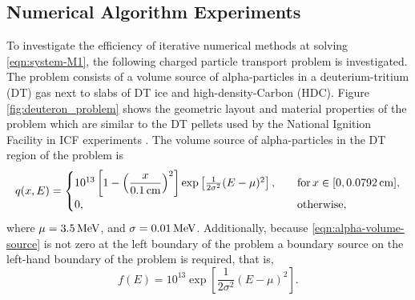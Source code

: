 \subsection{Numerical Algorithm Experiments}
To investigate the efficiency of iterative numerical methods at solving \ref{eqn:system-M1}, the following charged particle transport problem is investigated. The problem consists of a volume source of alpha-particles in a deuterium-tritium (DT) gas next to slabs of DT ice and high-density-Carbon (HDC). Figure \ref{fig:deuteron_problem} shows the geometric layout and material properties of the problem which are similar to the DT pellets used by the National Ignition Facility in ICF experiments \cite{Lindl-2018}\cite{Pape-2018}. The volume source of alpha-particles in the DT region of the problem is
\begin{equation}
  \label{eqn:alpha-volume-source}
  q(x,E) = 
  \begin{cases}
    10^{13} \left[1 - \left(\dfrac{x}{0.1 \cm}\right)^2 \right] \exp\left[\frac{1}{2 \sigma^2}(E - \mu)^2 \right], \quad &\text{for} \, x \in [0,0.0792 \cm], \\
    0, \quad\quad &\text{otherwise},
  \end{cases}
\end{equation}
where $\mu=3.5 \,\text{MeV}$, and $\sigma = 0.01 \,\text{MeV}$. Additionally, because \ref{eqn:alpha-volume-source} is not zero at the left boundary of the problem a boundary source on the left-hand boundary of the problem is required, that is,
\begin{equation}
  f(E) = 10^{13} \exp\left[\frac{1}{2 \sigma^2}(E - \mu)^2 \right].
\end{equation}

